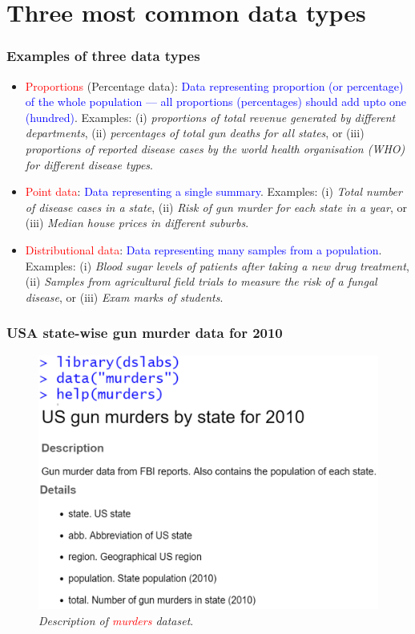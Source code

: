 \documentclass{beamer}
\begin{document}
\section{Three most common data types}
\begin{frame}[t]\frametitle{Examples of three data types}
\small
\begin{itemize}
\item \textcolor{red}{Proportions} (Percentage data): \textcolor{blue}{Data representing proportion (or percentage) of the whole population --- all proportions (percentages) should add upto one (hundred)}. Examples: (i) \textit{proportions of total revenue generated by different departments}, (ii) \textit{percentages of total gun deaths for all states}, or (iii) \textit{proportions of reported disease cases by the world health organisation (WHO) for different disease types}.

\item<2-> \textcolor{red}{Point data}: \textcolor{blue}{Data representing a single summary}. Examples: (i) \textit{Total number of disease cases in a state}, (ii) \textit{Risk of gun murder for each state in a year}, or (iii) \textit{Median house prices in different suburbs}.

\item<3-> \textcolor{red}{Distributional data}: \textcolor{blue}{Data representing many samples from a population}. Examples: (i) \textit{Blood sugar levels of patients after taking a new drug treatment}, (ii) \textit{Samples from agricultural field trials to measure the risk of a fungal disease}, or (iii) \textit{Exam marks of students}.
\end{itemize}
\end{frame}

\normalsize
\begin{frame}[t]\frametitle{USA state-wise gun murder data for 2010}\vspace{5pt}
\begin{figure}
\includegraphics[width=0.90\linewidth]{PlotsLec1/Murders}
\caption{\textit{Description of \textcolor{red}{murders} dataset}.}
\end{figure}
\end{frame}
\end{document}
